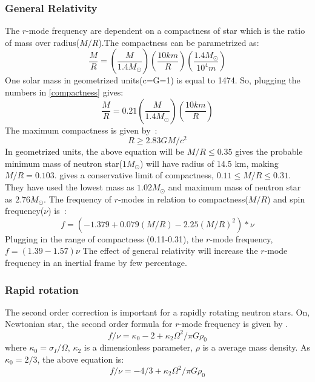 \documentclass{ttuthes2007}
\begin{document}
\subsubsection{General Relativity}
The $r$-mode frequency are dependent on a compactness of star which is the ratio
of mass over radius($M/R$).The compactness can be parametrized as:
\begin{equation}\label{compactness}
\frac{M}{R}=\left(\frac{M}{1.4M_\odot}\right)\left(\frac{10km}{R}\right)\left(\frac{1.4M_\odot}{10^4m}\right)
\end{equation} 
One solar mass in geometrized units(c=G=1) is equal to 1474. So, plugging the
numbers in \ref{compactness} gives:
\begin{equation}
\frac{M}{R}=0.21\left(\frac{M}{1.4M_\odot}\right)\left(\frac{10km}{R}\right)
\end{equation} 
The maximum compactness is given by~\cite{LATTIMER_2007}:
\begin{equation}
R \geq 2.83GM/c^2
\end{equation}
In geometrized units, the above equation will be $M/R \leq 0.35$
\citet{LATTIMER_2007} gives the probable minimum mass of neutron
star($1M_\odot$) will have radius of 14.5 km, making $M/R=0.103$.
\citet{Idrisy_2015} gives a conservative limit of compactness, $0.11 \leq M/R
\leq 0.31$. They have used the lowest mass as $1.02M_\odot$ and maximum mass of
neutron star as $2.76M_\odot$. The frequency of $r$-modes in relation to
compactness($M/R$) and spin frequency($\nu$) is~\cite{Idrisy_2015}: 
\begin{equation}
f=(-1.379 + 0.079(M/R) - 2.25(M/R)^2)*\nu
\end{equation}  
Plugging in the range of compactness (0.11-0.31), the $r$-mode frequency,
$f=(1.39-1.57)\nu$
The effect of general relativity will increase the $r$-mode frequency in an
inertial frame by few percentage.

\subsubsection{Rapid rotation}
The second order correction is important for a rapidly rotating neutron stars.
On, Newtonian star, the second order formula for $r$-mode frequency is given by 
\cite{Lindblom_1999}.
\begin{equation}
f/\nu=\kappa_0 - 2 + \kappa_2 \Omega^2/\pi G \rho_0
\end{equation}
where $\kappa_0=\sigma_I/\Omega$, $\kappa_2$ is a dimensionless parameter,
$\rho$ is a average mass density.
As $\kappa_0=2/3$, the above equation is:
\begin{equation}
f/\nu = -4/3 + \kappa_2 \Omega^2/\pi G \rho_0
\end{equation}
\end{document}
